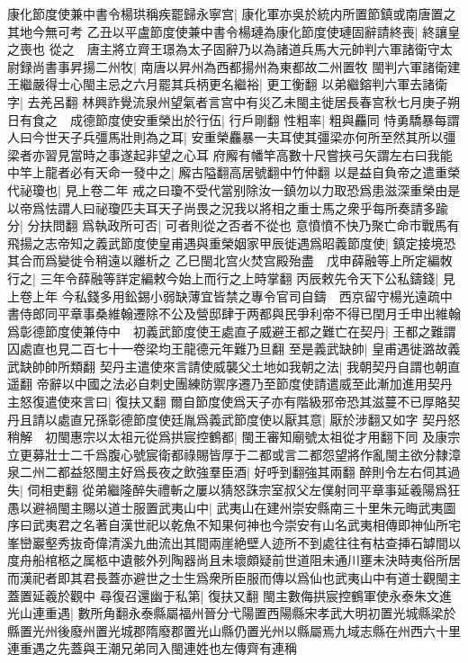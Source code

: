 康化節度使兼中書令楊珙稱疾罷歸永寧宫|{
	康化軍亦吳於統内所置節鎮或南唐置之其地今無可考}
乙丑以平盧節度使兼中書令楊璉為康化節度使璉固辭請終喪|{
	終讓皇之喪也}
從之　唐主將立齊王璟為太子固辭乃以為諸道兵馬大元帥判六軍諸衛守太尉録尚書事昇揚二州牧|{
	南唐以昇州為西都揚州為東都故二州置牧}
閩判六軍諸衛建王繼嚴得士心閩主忌之六月罷其兵柄更名繼裕|{
	更工衡翻}
以弟繼鎔判六軍去諸衛字|{
	去羌呂翻}
林興詐覺流泉州望氣者言宫中有災乙未閩主徙居長春宫秋七月庚子朔日有食之　成德節度使安重榮出於行伍|{
	行戶剛翻}
性粗率|{
	粗與麤同}
恃勇驕暴每謂人曰今世天子兵彊馬壯則為之耳|{
	安重榮麤暴一夫耳使其彊梁亦何所至然其所以彊梁者亦習見當時之事遂起非望之心耳}
府廨有幡竿高數十尺嘗挾弓矢謂左右曰我能中竿上龍者必有天命一發中之|{
	廨古隘翻高居號翻中竹仲翻}
以是益自負帝之遣重榮代祕瓊也|{
	見上卷二年}
戒之曰瓊不受代當别除汝一鎮勿以力取恐爲患滋深重榮由是以帝爲怯謂人曰祕瓊匹夫耳天子尚畏之況我以將相之重士馬之衆乎每所奏請多踰分|{
	分扶問翻}
爲執政所可否|{
	可者則從之否者不從也}
意憤憤不快乃聚亡命市戰馬有飛揚之志帝知之義武節度使皇甫遇與重榮姻家甲辰徙遇爲昭義節度使|{
	鎮定接境恐其合而爲變徙令稍遠以離析之}
乙巳閩北宫火焚宫殿殆盡　戊申薛融等上所定編敇行之|{
	三年令薛融等詳定編敕今始上而行之上時掌翻}
丙辰敕先令天下公私鑄錢|{
	見上卷上年}
今私錢多用鈆錫小弱缺薄宜皆禁之專令官司自鑄　西京留守楊光遠疏中書侍郎同平章事桑維翰遷除不公及營邸肆于两都與民爭利帝不得已閏月壬申出維翰爲彰德節度使兼侍中　初義武節度使王處直子威避王都之難亡在契丹|{
	王都之難謂囚處直也見二百七十一卷梁均王龍德元年難乃旦翻}
至是義武缺帥|{
	皇甫遇徙潞故義武缺帥帥所類翻}
契丹主遣使來言請使威襲父土地如我朝之法|{
	我朝契丹自謂也朝直遥翻}
帝辭以中國之法必自刺史團練防禦序遷乃至節度使請遣威至此漸加進用契丹主怒復遣使來言曰|{
	復扶又翻}
爾自節度使爲天子亦有階級邪帝恐其滋蔓不已厚賂契丹且請以處直兄孫彰德節度使廷胤爲義武節度使以厭其意|{
	厭於涉翻又如字}
契丹怒稍解　初閩惠宗以太祖元從爲拱宸控鶴都|{
	閩王審知廟號太祖從才用翻下同}
及康宗立更募壯士二千爲腹心號宸衛都祿賜皆厚于二都或言二都怨望將作亂閩主欲分隸漳泉二州二都益怒閩主好爲長夜之飲強羣臣酒|{
	好呼到翻強其兩翻}
醉則令左右伺其過失|{
	伺相吏翻}
從弟繼隆醉失禮斬之屢以猜怒誅宗室叔父左僕射同平章事延羲陽爲狂愚以避禍閩主賜以道士服置武夷山中|{
	武夷山在建州崇安縣南三十里朱元晦武夷圖序曰武夷君之名著自漢世祀以乾魚不知果何神也今崇安有山名武夷相傳即神仙所宅峯巒巖壑秀抜奇偉清溪九曲流出其間兩崖絶壁人迹所不到處往往有枯查挿石罅間以度舟船棺柩之属柩中遺骸外列陶器尚且未壞頗疑前世道阻未通川壅未決時夷俗所居而漢祀者即其君長蓋亦避世之士生爲衆所臣服而傳以爲仙也武夷山中有道士觀閩主蓋置延羲於觀中}
尋復召還幽于私第|{
	復扶又翻}
閩主數侮拱宸控鶴軍使永泰朱文進光山連重遇|{
	數所角翻永泰縣屬福州晉分弋陽置西陽縣宋孝武大明初置光城縣梁於縣置光州後廢州置光城郡隋廢郡置光山縣仍置光州以縣屬焉九域志縣在州西六十里連重遇之先蓋與王潮兄弟同入閩連姓也左傳齊有連稱}
